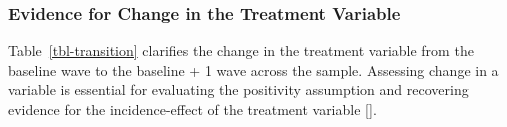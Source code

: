 \documentclass[
  single column]{article}
\begin{document}
\subsubsection{Evidence for Change in the Treatment
Variable}\label{evidence-for-change-in-the-treatment-variable}

Table~\ref{tbl-transition} clarifies the change in the treatment
variable from the baseline wave to the baseline + 1 wave across the
sample. Assessing change in a variable is essential for evaluating the
positivity assumption and recovering evidence for the incidence-effect
of the treatment variable {[}{]}.

\begin{table}

\caption{\label{tbl-placeholder}}

\centering{

\captionsetup{labelsep=none}

}

\end{table}%
\end{document}
